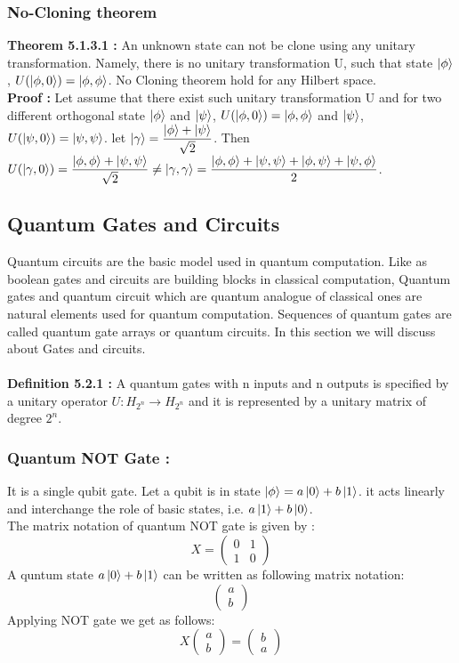 \documentclass[11 pt]{article}
\theoremstyle{definition}
\theoremstyle{remark}
\begin{document}
\subsubsection{No-Cloning theorem}
\textbf{Theorem 5.1.3.1 :} An unknown state can not be clone using any unitary transformation. Namely, there is no unitary transformation U, such that state $\ket{\phi}$, $U(\ket{\phi,0}) = \ket{\phi,\phi}$. No Cloning theorem hold for any Hilbert space.\\
\textbf{Proof :} Let assume that there exist such unitary transformation U and for two different orthogonal state $\ket{\phi}$ and $\ket{\psi}$, $U(\ket{\phi,0}) = \ket{\phi,\phi}$ and $\ket{\psi}$, $U(\ket{\psi,0}) = \ket{\psi,\psi}$. let $\ket{\gamma} = \dfrac{\ket{\phi} + \ket{\psi}}{\sqrt{2}}$. Then $U(\ket{\gamma,0}) = \dfrac{\ket{\phi,\phi} + \ket{\psi,\psi}}{\sqrt{2}} \neq \ket{\gamma,\gamma} = \dfrac{\ket{\phi,\phi} + \ket{\psi,\psi} + \ket{\phi,\psi} + \ket{\psi,\phi}}{2}$.

\subsection{Quantum Gates and Circuits}
Quantum circuits are the basic model used in quantum computation. Like as boolean gates and circuits are building blocks in classical computation, Quantum gates and quantum circuit which are quantum analogue of classical ones are natural elements used for quantum computation. Sequences of quantum gates are called quantum gate arrays or quantum circuits. In this section we will discuss about Gates and circuits.\\
\\
\textbf{Definition 5.2.1 :} A quantum gates with n inputs and n outputs is specified by a unitary operator $U: H_{2^n} \rightarrow H_{2^n}$ and it is represented by a unitary matrix of degree $2^n$.

\subsubsection{Quantum NOT Gate :}
It is a single qubit gate. Let a qubit is in state $\ket{\phi} = a\ket{0} + b\ket{1}$. it acts linearly and interchange the role of basic states, i.e. $a\ket{1} + b\ket{0}$.\\
The matrix notation of quantum NOT gate is given by :
$$X = \begin{pmatrix}
           0 & 1\\
           1 & 0
\end{pmatrix} $$
A quntum state $a\ket{0} + b\ket{1}$ can be written as following matrix notation:
$$\begin{pmatrix}
           a\\
           b
\end{pmatrix}$$
Applying NOT gate we get as follows:
$$ X \begin{pmatrix}
           a\\b
\end{pmatrix} = \begin{pmatrix}
           b\\a
\end{pmatrix}$$
\end{document}
